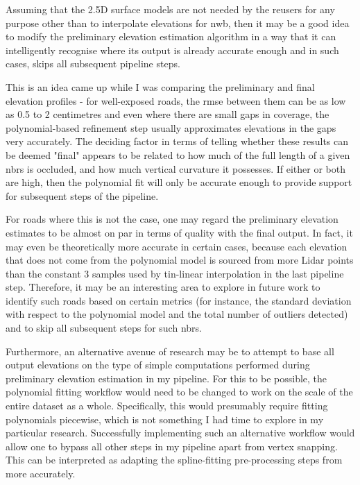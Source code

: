 Assuming that the 2.5D surface models are not needed by the reusers for any purpose other than to interpolate elevations for \ac{nwb}, then it may be a good idea to modify the preliminary elevation estimation algorithm in a way that it can intelligently recognise where its output is already accurate enough and in such cases, skips all subsequent pipeline steps.

This is an idea came up while I was comparing the preliminary and final elevation profiles - for well-exposed roads, the \ac{rmse} between them can be as low as 0.5 to 2 centimetres and even where there are small gaps in coverage, the polynomial-based refinement step usually approximates elevations in the gaps very accurately. The deciding factor in terms of telling whether these results can be deemed "final" appears to be related to how much of the full length of a given \ac{nbrs} is occluded, and how much vertical curvature it possesses. If either or both are high, then the polynomial fit will only be accurate enough to provide support for subsequent steps of the pipeline.

For roads where this is not the case, one may regard the preliminary elevation estimates to be almost on par in terms of quality with the final output. In fact, it may even be theoretically more accurate in certain cases, because each elevation that does not come from the polynomial model is sourced from more Lidar points than the constant 3 samples used by \ac{tin}-linear interpolation in the last pipeline step. Therefore, it may be an interesting area to explore in future work to identify such roads based on certain metrics (for instance, the standard deviation with respect to the polynomial model and the total number of outliers detected) and to skip all subsequent steps for such \ac{nbrs}.

Furthermore, an alternative avenue of research may be to attempt to base all output elevations on the type of simple computations performed during preliminary elevation estimation in my pipeline. For this to be possible, the polynomial fitting workflow would need to be changed to work on the scale of the entire dataset as a whole. Specifically, this would presumably require fitting polynomials piecewise, which is not something I had time to explore in my particular research. Successfully implementing such an alternative workflow would allow one to bypass all other steps in my pipeline apart from vertex snapping. This can be interpreted as adapting the spline-fitting pre-processing steps from \cite{boyko_funkhauser_2011} more accurately.

